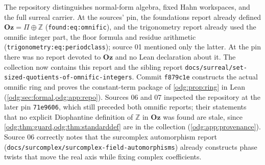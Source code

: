 \documentclass[11pt,oneside]{article}
\numberwithin{equation}{section}
\theoremstyle{definition}
\theoremstyle{remark}
\newcommand{\Oz}{\mathbf{Oz}}
\newcommand{\Z}{\mathbb Z}
\newcommand{\replabel}[1]{\nolinkurl{#1}}
\newcommand{\fn}[1]{\nolinkurl{#1}}
\begin{document}
The repository distinguishes normal-form algebra, fixed Hahn workspaces, and
the full surreal carrier. At the sources' pin, the foundations report already
defined $\Oz=\Pi\oplus\Z$ (\replabel{found:eq:omnific}), and the trigonometry
report already used the omnific integer part, the floor formula and residue
arithmetic (\replabel{trigonometry:eq:periodclass}); source 01 mentioned only
the latter. At the pin there was no report devoted to $\Oz$ and no Lean
declaration about it. The collection now contains this report and the sibling
report \fn{docs/surreal/set-sized-quotients-of-omnific-integers}. Commit
\texttt{f879c1e} constructs the actual omnific ring and proves the
constant-term package of \cref{odg:prop:ring} in Lean
(\cref{odg:sec:formal,odg:app:repo}). Sources 06 and 07 inspected the
repository at the later pin \texttt{71e9606}, which still preceded both
omnific reports; their statements that no explicit Diophantine definition of
$\Z$ in $\Oz$ was found are stale, since \cref{odg:thm:guard,odg:thm:standarddef}
are in the collection (\cref{odg:app:provenance}). Source 06 correctly notes
that the surcomplex automorphism report
(\fn{docs/surcomplex/surcomplex-field-automorphisms}) already constructs phase
twists that move the real axis while fixing complex coefficients.
\end{document}
